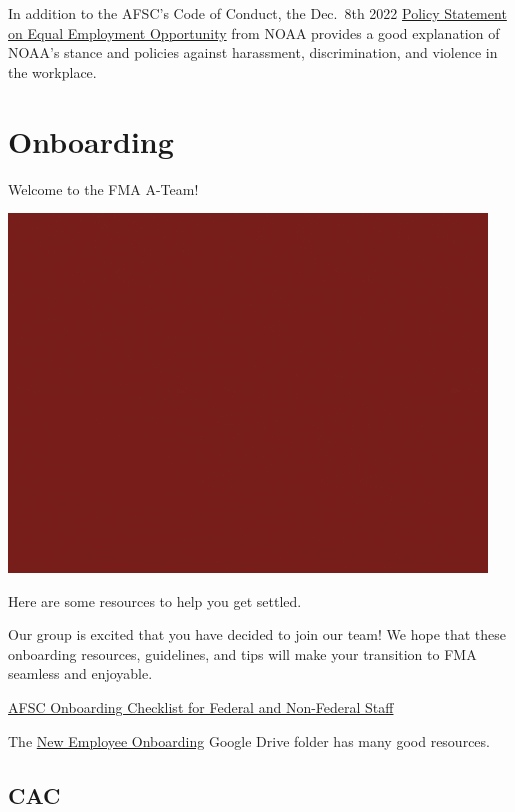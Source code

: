 \documentclass[
  letterpaper,
  DIV=11,
  numbers=noendperiod]{scrreprt}
\begin{document}
In addition to the AFSC's Code of Conduct, the Dec.~8th 2022
\href{https://www.noaa.gov/organization/inclusion-and-civil-rights/policy-statement-on-equal-employment-opportunity}{Policy
Statement on Equal Employment Opportunity} from NOAA provides a good
explanation of NOAA's stance and policies against harassment,
discrimination, and violence in the workplace.


\hypertarget{onboarding}{%
\chapter{Onboarding}\label{onboarding}}

Welcome to the FMA A-Team!

\includegraphics{_img/a-team-gify.gif}

Here are some resources to help you get settled.

Our group is excited that you have decided to join our team! We hope
that these onboarding resources, guidelines, and tips will make your
transition to FMA seamless and enjoyable.

\href{https://drive.google.com/file/d/1Gxg-tw76NeptYFkya7M6JSyxsy31mmAu/view?usp=sharing}{AFSC
Onboarding Checklist for Federal and Non-Federal Staff}

The
\href{https://drive.google.com/drive/folders/1aZcoJooHxNMh4kjCiv4WUgpDtszub1PI}{New
Employee Onboarding} Google Drive folder has many good resources.

\hypertarget{cac}{%
\section{CAC}\label{cac}}
\end{document}
